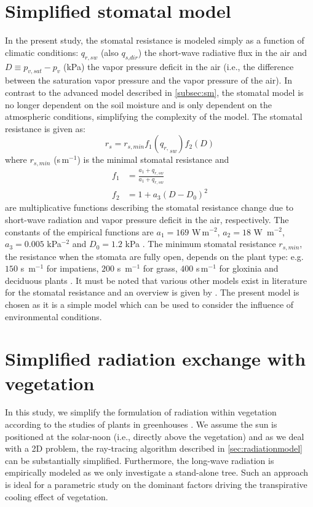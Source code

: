 \section{Simplified stomatal model}
\label{sec:simplifiedstomatalmodel}
In the present study, the stomatal resistance is modeled simply as a function of climatic conditions: $q_{\mathit{r,sw}}$ (also $q_{\textit{s,dir}}$) the short-wave radiative flux in the air and $D\equiv p_{\mathit{v,sat}} - p_v$ (kPa) the vapor pressure deficit in the air (i.e., the difference between the saturation vapor pressure and the vapor pressure of the air). In contrast to the advanced model described in \cref{subsec:sm}, the stomatal model is no longer dependent on the soil moisture and is only dependent on the atmospheric conditions, simplifying the complexity of the model. The stomatal resistance is given as:
\begin{equation}
{r_s} = {r_{s,{\mathit{min}}}}{f_1}({q_{r,}}_{sw}){f_2}(D)
\label{eq:rs}
\end{equation}
where $r_{\mathit{s,min}}$ (s\,m$^{-1}$) is the minimal stomatal resistance and
\begin{align}
f_1 &= \frac{a_1 + q_{\mathit{r,sw}}}{a_1 + q_{\mathit{r,sw}}}\\
f_2 &= 1 + a_3 (D-D_0)^2
\end{align}
are multiplicative functions describing the stomatal resistance change due to short-wave radiation and vapor pressure deficit in the air, respectively. The constants of the empirical functions are $a_1=169$ W\,m$^{-2}$, $a_2=18$ W~m$^{-2}$, $a_3=\num{0.005}$ kPa$^{-2}$ and $D_0=1.2$ kPa \citep{Kichah2012}. The minimum stomatal resistance $r_{s,\mathit{min}}$, the resistance when the stomata are fully open, depends on the plant type: e.g. $150$ s~m$^{-1}$ for impatiens, $200$ s~m$^{-1}$ for grass, $400$ s\,m$^{-1}$ for gloxinia and deciduous plants \citep{Baille1994, Bruse1998}. It must be noted that various other models exist in literature for the stomatal resistance and an overview is given by \cite{Damour2010}. The present model is chosen as it is a simple model which can be used to consider the influence of environmental conditions. 

\section{Simplified radiation exchange with vegetation}
\label{sec:vegradiation}

In this study, we simplify the formulation of radiation within vegetation according to the studies of plants in greenhouses \citep{Boulard2002, Majdoubi2009, Fatnassi2006, Kichah2012}. We assume the sun is positioned at the solar-noon (i.e., directly above the vegetation) and as we deal with a 2D problem, the ray-tracing algorithm described in \cref{sec:radiationmodel} can be substantially simplified. Furthermore, the long-wave radiation is empirically modeled as we only investigate a stand-alone tree. Such an approach is ideal for a parametric study on the dominant factors driving the transpirative cooling effect of vegetation. 

